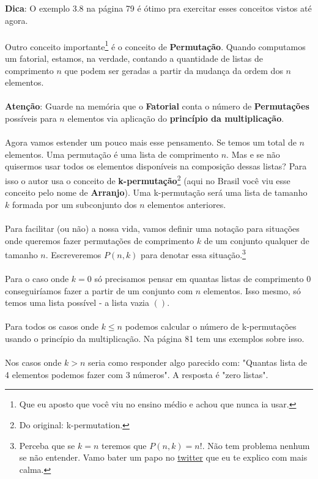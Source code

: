 \documentclass[a4paper,11pt]{book}
\theoremstyle{definition}
\theoremstyle{break}
\begin{document}
\textbf{Dica}: O exemplo 3.8 na página 79 é ótimo pra exercitar esses conceitos vistos até agora.
\\
\\
Outro conceito importante\footnote{Que eu aposto que você viu no ensino médio e achou que nunca ia usar.} é o conceito de \textbf{Permutação}. Quando computamos um fatorial, estamos, na verdade, contando a quantidade de listas de comprimento $n$ que podem ser geradas a partir da mudança da ordem dos $n$ elementos.
\\
\\
\textbf{Atenção}: Guarde na memória que o \textbf{Fatorial} conta o número de \textbf{Permutações} possíveis para $n$ elementos via aplicação do \textbf{princípio da multiplicação}.
\\
\\
Agora vamos estender um pouco mais esse pensamento. Se temos um total de $n$ elementos. Uma permutação é uma lista de comprimento $n$. Mas e se não quisermos usar todos os elementos disponíveis na composição dessas listas? Para isso o autor usa o conceito de \textbf{k-permutação}\footnote{Do original: k-permutation.} (aqui no Brasil você viu esse conceito pelo nome de \textbf{Arranjo}). Uma k-permutação será uma lista de tamanho $k$ formada por um subconjunto dos $n$ elementos anteriores.
\\
\\
Para facilitar (ou não) a nossa vida, vamos definir uma notação para situações onde queremos fazer permutações de comprimento $k$ de um conjunto qualquer de tamanho $n$. Escreveremos $P(n,k)$ para denotar essa situação.\footnote{Perceba que se $k = n$ teremos que $P(n,k) = n!$. Não tem problema nenhum se não entender. Vamo bater um papo no \href{https://twitter.com/bruno_ruas2}{twitter} que eu te explico com mais calma.} 
\\
\\
Para o caso onde $k = 0$ só precisamos pensar em quantas listas de comprimento $0$ conseguiríamos fazer a partir de um conjunto com $n$ elementos. Isso mesmo, só temos uma lista possível - a lista vazia $()$. 
\\
\\
Para todos os casos onde $k \leq n$ podemos calcular o número de k-permutações usando o princípio da multiplicação. Na página 81 tem uns exemplos sobre isso.
\\
\\
Nos casos onde $k > n$ seria como responder algo parecido com: "Quantas lista de 4 elementos podemos fazer com 3 números". A resposta é "zero listas".
\end{document}
